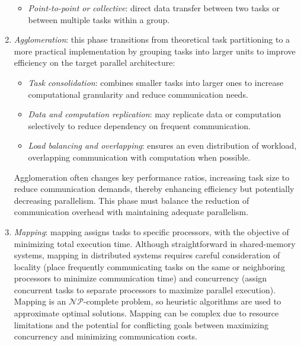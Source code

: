 \begin{enumerate}
\begin{itemize}
            \item \textit{Point-to-point or collective}: direct data transfer between two tasks or between multiple tasks within a group. 
        \end{itemize} 
    \item \textit{Agglomeration}: this phase transitions from theoretical task partitioning to a more practical implementation by grouping tasks into larger units to improve efficiency on the target parallel architecture: 
        \begin{itemize}
            \item \textit{Task consolidation}: combines smaller tasks into larger ones to increase computational granularity and reduce communication needs.
            \item \textit{Data and computation replication}: may replicate data or computation selectively to reduce dependency on frequent communication.
            \item \textit{Load balancing and overlapping}: ensures an even distribution of workload, overlapping communication with computation when possible.
        \end{itemize}
        Agglomeration often changes key performance ratios, increasing task size to reduce communication demands, thereby enhancing efficiency but potentially decreasing parallelism. 
        This phase must balance the reduction of communication overhead with maintaining adequate parallelism.
    \item \textit{Mapping}: mapping assigns tasks to specific processors, with the objective of minimizing total execution time. 
        Although straightforward in shared-memory systems, mapping in distributed systems requires careful consideration of locality (place frequently communicating tasks on the same or neighboring processors to minimize communication time) and concurrency (assign concurrent tasks to separate processors to maximize parallel execution).
        Mapping is an $\mathcal{NP}$-complete problem, so heuristic algorithms are used to approximate optimal solutions.
        Mapping can be complex due to resource limitations and the potential for conflicting goals between maximizing concurrency and minimizing communication costs.
\end{enumerate}